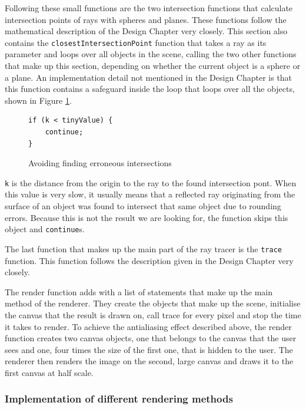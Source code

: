 \documentclass[11pt]{report}
\begin{document}
Following these small functions are the two intersection functions that calculate intersection points of rays with spheres and planes. These functions follow the mathematical description of the Design Chapter very closely. This section also contains the \texttt{closestIntersectionPoint} function that takes a ray as its parameter and loops over all objects in the scene, calling the two other functions that make up this section, depending on whether the current object is a sphere or a plane. An implementation detail not mentioned in the Design Chapter is that this function contains a safeguard inside the loop that loops over all the objects, shown in Figure \ref{irenderer1}.

\begin{figure}[ht]
\begin{lstlisting}
if (k < tinyValue) {
    continue;
}
\end{lstlisting}
\caption{Avoiding finding erroneous intersections}
\label{irenderer1}
\end{figure}

\texttt{k} is the distance from the origin to the ray to the found intersection pont. When this value is very slow, it usually means that a reflected ray originating from the surface of an object was found to intersect that same object due to rounding errors. Because this is not the result we are looking for, the function skips this object and \texttt{continue}s.

The last function that makes up the main part of the ray tracer is the \texttt{trace} function. This function follows the description given in the Design Chapter very closely.

The render function adds with a list of statements that make up the main method of the renderer. They create the objects that make up the scene, initialise the canvas that the result is drawn on, call trace for every pixel and stop the time it takes to render. To achieve the antialiasing effect described above, the render function creates two canvas objects, one that belongs to the canvas that the user sees and one, four times the size of the first one, that is hidden to the user. The renderer then renders the image on the second, large canvas and draws it to the first canvas at half scale. 

\subsubsection{Implementation of different rendering methods}
\end{document}
